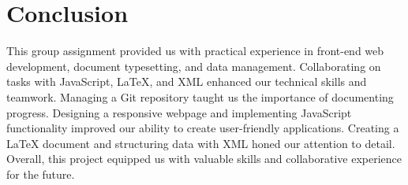 \documentclass{article}
\begin{document}
\section{Conclusion}

This group assignment provided us with practical experience in front-end web development, document typesetting, and data management. Collaborating on tasks with JavaScript, LaTeX, and XML enhanced our technical skills and teamwork. Managing a Git repository taught us the importance of documenting progress. Designing a responsive webpage and implementing JavaScript functionality improved our ability to create user-friendly applications. Creating a LaTeX document and structuring data with XML honed our attention to detail. Overall, this project equipped us with valuable skills and collaborative experience for the future.
\end{document}
